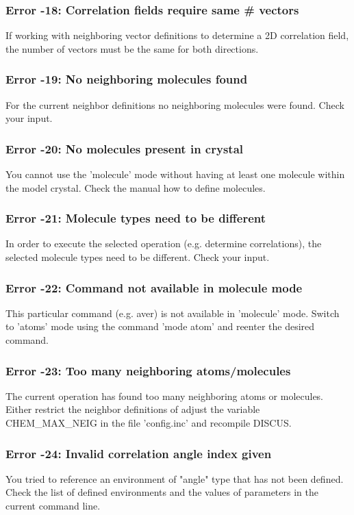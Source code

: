 \subsubsection{Error -18: Correlation fields require same \# vectors}
\par
If working with neighboring vector definitions to determine a 
2D correlation field, the number of vectors must be the same for both 
directions. 
\subsubsection{Error -19: No neighboring molecules found}
\par
For the current neighbor definitions no neighboring molecules were 
found. Check your input. 
\subsubsection{Error -20: No molecules present in crystal}
\par
You cannot use the 'molecule' mode without having at least one molecule 
within the model crystal. Check the manual how to define molecules. 
\subsubsection{Error -21: Molecule types need to be different}
\par
In order to execute the selected operation (e.g. determine correlations), 
the selected molecule types need to be different. Check your input. 
\subsubsection{Error -22: Command not available in molecule mode}
\par
This particular command (e.g. aver) is not available in 'molecule' 
mode. Switch to 'atoms' mode using the command 'mode atom' and 
reenter the desired command. 
\subsubsection{Error -23: Too many neighboring atoms/molecules}
\par
The current operation has found too many neighboring atoms or molecules. 
Either restrict the neighbor definitions of adjust the variable 
CHEM\_MAX\_NEIG in the file 'config.inc' and recompile DISCUS. 
\subsubsection{Error -24: Invalid correlation angle index given}
\par
\par
You tried to reference an environment of "angle" type that 
has not been defined. Check the list of defined environments and 
the values of parameters in the current command line. 
